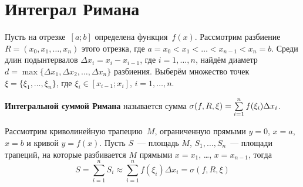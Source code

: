 \section{Интеграл Римана}
Пусть на отрезке~$[a; b]$ определена функция~$f(x)$.
Рассмотрим разбиение~$R = (x_0, x_1, \ldots, x_n)$ этого отрезка, где $a = x_0 < x_1 < \ldots < x_{n-1} < x_n = b$.
Среди длин подынтервалов $\Delta x_i = x_i - x_{i-1}$, где $i = 1, \ldots, n$, найдём диаметр $d = \max \{ \Delta x_1, \Delta x_2, \ldots, \Delta x_n \}$ разбиения.
Выберём множество точек $\xi = \{ \xi_1, \ldots, \xi_n \}$, где $\xi_i \in [x_{i-1}; x_i]$, $i = 1, \ldots, n$.

\begin{wrapfigure}[10]{r}{0pt}
\noindent
{}
\end{wrapfigure}

\textbf{Интегральной суммой Римана} называется сумма $\sigma(f, R, \xi) \opbr= \sum\limits_{i=1}^n f(\xi_i) \Delta x_i$.

Рассмотрим криволинейную трапецию~$M$, ограниченную прямыми $y = 0$, $x = a$, $x = b$ и кривой $y = f(x)$. Пусть $S$~--- площадь $M$, $S_1, \ldots, S_n$~--- площади трапеций, на которые разбивается $M$ прямыми $x = x_1$, \ldots, $x = x_{n-1}$, тогда
\begin{equation*}
S = \sum_{i=1}^n S_i \approx \sum_{i=1}^n f(\xi_i) \Delta x_i = \sigma(f, R, \xi)
\end{equation*}

